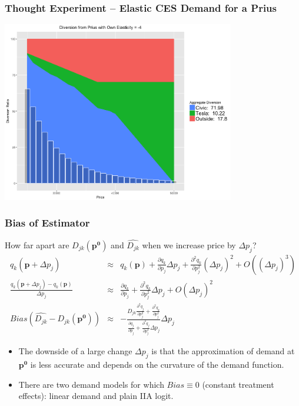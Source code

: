 \documentclass[xcolor=pdftex,dvipsnames,table,mathserif,aspectratio=169]{beamer}
\begin{document}
\begin{frame}
\frametitle{Thought Experiment -- Elastic CES Demand for a Prius}
\begin{center}
\includegraphics[width=4in]{./resources/new_prius4.png}
\end{center}
\end{frame}


\begin{frame}
\frametitle{Bias of Estimator}
\footnotesize
How far apart are $D_{jk}(\mathbf{p^0})$ and $\widehat{D_{jk}}$ when we increase price by $\Delta p_j$? 
\begin{eqnarray*}
\nonumber q_k(\mathbf{p}+ \Delta p_j) &\approx& q_k(\mathbf{p}) + \frac{\partial q_k}{\partial p_j} \Delta p_j + \frac{\partial^2 q_k}{\partial p_j^2} (\Delta p_j)^2 + O((\Delta p_j)^3) \\
\frac{ q_k(\mathbf{p}+ \Delta p_j)-q_k(\mathbf{p}) }{\Delta p_j} &\approx& \frac{\partial q_k}{\partial p_j}+ \frac{\partial^2 q_k}{\partial p_j^2} \Delta p_j + O(\Delta p_j)^2 \\
Bias(\widehat{D_{jk}} -D_{jk}(\mathbf{p^0})) &\approx& -  \frac{D_{jk} \frac{\partial^2 q_j}{\partial p_j^2} +  \frac{\partial^2 q_k}{\partial p_j^2} }{\frac{\partial q_j}{\partial p_j} + \frac{\partial^2 q_j}{\partial p_j^2}\Delta p_j } \Delta p_j
\end{eqnarray*}
\begin{itemize}
\item The downside of a large change $\Delta p_j$ is that the approximation of demand at $\mathbf{p^0}$ is less accurate and depends on the curvature of the demand function.
\item There are two demand models for which $Bias \equiv 0$ \alert{(constant treatment effects)}: \pause linear demand and plain IIA logit.
\end{itemize}
\end{frame}
\end{document}
